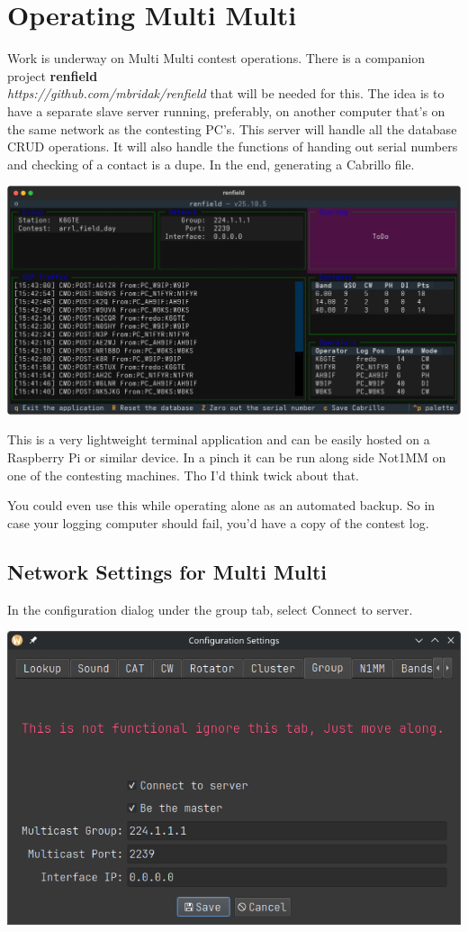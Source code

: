 \documentclass{article}
\begin{document}
\section{Operating Multi Multi}

Work is underway on Multi Multi contest operations. There is a companion project \textbf{renfield}\\
\emph{https://github.com/mbridak/renfield} that will be needed for this. The idea is to have a separate slave server running, preferably, on another computer that's on the same network as the contesting PC's. This server will handle all the database CRUD operations. It will also handle the functions of handing out serial numbers and checking of a contact is a dupe. In the end, generating a Cabrillo file.

\vspace{0.5cm}
\begin{center}
\includegraphics[width=0.75\linewidth]{pic/renfield_cli.png}
\end{center}
\vspace{0.5cm}

This is a very lightweight terminal application and can be easily hosted on a Raspberry Pi or similar device. In a pinch it can be run along side Not1MM on one of the contesting machines. Tho I'd think twick about that.

You could even use this while operating alone as an automated backup. So in case your logging computer should fail, you'd have a copy of the contest log.
\subsection{Network Settings for Multi Multi}
In the configuration dialog under the group tab, select Connect to server.

\vspace{0.5cm}
\begin{center}
\includegraphics[width=0.5\linewidth]{pic/configuration_group.png}
\end{center}
\vspace{0.5cm}
\end{document}
